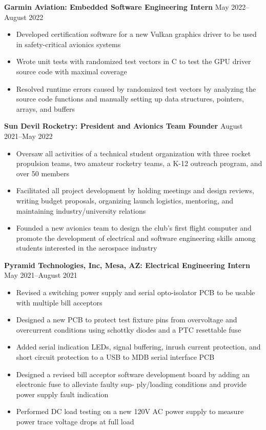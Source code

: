 \documentclass{article}
\begin{document}
\vspace{1em}
\textbf{Garmin Aviation: Embedded Software Engineering Intern}
\hfill
\vspace{0.5em}
May 2022--August 2022
\begin{itemize}
\item{Developed certification software for a new Vulkan graphics driver to be used in safety-critical avionics systems}
\item{Wrote unit tests with randomized test vectors in C to test the GPU driver source code with maximal coverage}
\item{Resolved runtime errors caused by randomized test vectors by analyzing the source code functions and manually setting up data structures, pointers, arrays, and buffers}
\end{itemize}
\vspace{1em}
\textbf{Sun Devil Rocketry: President and Avionics Team Founder}
\hfill
\vspace{0.5em}
August 2021--May 2022
\begin{itemize}
\item{Oversaw all activities of a technical student organization with three rocket propulsion teams, two amateur rocketry teams, a K-12 outreach program, and over 50 members   }
\item{Facilitated all project development by holding meetings and design reviews, writing budget proposals, organizing launch logistics, mentoring, and maintaining industry/university relations}
\item{Founded a new avionics team to design the club's first flight computer and promote the development of electrical and software engineering skills among students interested in the aerospace industry}
\vspace{1em}
\end{itemize}
\textbf{Pyramid Technologies, Inc, Mesa, AZ: Electrical Engineering Intern}
\hfill 
\vspace{0.5em}
May 2021--August 2021
\begin{itemize}
\item{Revised a switching power supply and serial opto-isolator PCB to be usable with multiple bill acceptors}
\item{Designed a new PCB to protect test fixture pins from overvoltage and overcurrent conditions
	using schottky diodes and a PTC resettable fuse}
\item{Added serial indication LEDs, signal buffering, inrush current protection, and short circuit protection to a USB to MDB serial interface PCB}
\item{Designed a revised bill acceptor software development board by adding an electronic fuse to alleviate faulty sup-
	ply/loading conditions and provide power supply fault indication}
\item{Performed DC load testing on a new 120V AC power supply to measure power trace voltage drops at full load}
\end{itemize}
\vspace{0.5em}
\thispagestyle{empty}
\end{document}
